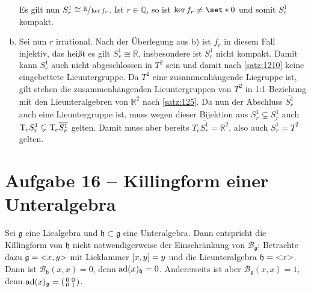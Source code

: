 \begin{beweis}
\begin{enumerate}[a)]
		Es gilt nun $S^1_r \cong \sfrac{\mathbb{R}}{\ker f_r}$.
		Ist $r \in \mathbb{Q}$, so ist $\ker f_r \neq \set*{0}$ und somit $S_r^1$ kompakt.
		\item Sei nun $r$ irrational.
		Nach der Überlegung aus b) ist $f_r$ in diesem Fall injektiv, das heißt es gilt $S_r^1 \cong \mathbb{R}$, insbesondere ist $S_r^1$ nicht kompakt.
		Damit kann $S_r^1$ auch nicht abgeschlossen in $T^2$ sein und damit nach \autoref{satz:1210} keine eingebettete Lieuntergruppe.
		Da $T^2$ eine zusammenhängende Liegruppe ist, gilt stehen die zusammenhängenden Lieuntergruppen von $T^2$ in 1:1-Beziehung mit den Lieunteralgebren von $\mathbb{R}^2$ nach \autoref{satz:125}.
		Da nun der Abschluss $\overline{S_r^1}$ auch eine Lieuntergruppe ist, muss wegen dieser Bijektion aus $S_r^1 \subsetneq \overline{S_r^1}$ auch $\Tmap_e S_r^1 \subsetneq \Tmap_e \overline{S_r^1}$ gelten.
		Damit muss aber bereits $T_e \overline{S_r^1} = \mathbb{R}^2$, also auch $\overline{S_r^1} = T^2$ gelten.\qedhere
	\end{enumerate}
\end{beweis}

\section{Aufgabe 16 -- Killingform einer Unteralgebra} %
\label{sec:einschr_killing}
Sei $\mathfrak{g}$ eine Liealgebra und $\mathfrak{h} \subset \mathfrak{g}$ eine Unteralgebra.
Dann entspricht die Killingform von $\mathfrak{h}$ nicht notwendigerweise der Einschränkung von $\mathcal{B}_{\mathfrak{g}}$: Betrachte dazu $\mathfrak{g} = \lenbrace{x,y}$ mit Lieklammer $\benbrace*{x,y} = y$ und die Lieunteralgebra $\mathfrak{h} = \lenbrace{x}$.  
Dann ist $\mathcal{B}_{\mathfrak{h}}(x,x) = 0$, denn $\ad(x)_{\mathfrak{h}} =0$.
Andererseits ist aber $\mathcal{B}_{\mathfrak{g}}(x,x) = 1$, denn $\ad(x)_\mathfrak{g} = \begin{psmallmatrix} 0 & 0 \\ 0 & 1 \end{psmallmatrix}$.

